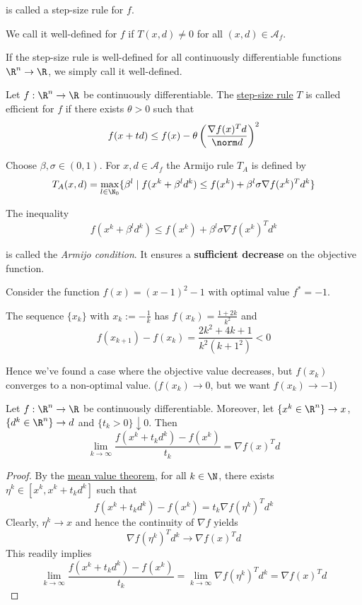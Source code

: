 is called a step-size rule for $f$.

We call it well-defined for $f$ if $T(x,d)\neq0$ for all
$(x,d)\in\mathcal{A}_f$.

If the step-size rule is well-defined for all continuously
differentiable functions ${\R}^n\to{\R}$, we simply call it
well-defined.


Let $f:\R^n\to\R$ be continuously differentiable. The
\hyperref[ae4eac6]{step-size rule} $T$ is called efficient for $f$ if
there exists $\theta>0$ such that
$$
	f(x+td)\leq f(x)-\theta\left(\frac{\nabla f(x)^Td}{\norm d}\right)^2
$$

\label{fefb024}

Choose $\beta,\sigma\in(0,1)$. For $x,d\in\hyperref[ae4eac6]{\mathcal
		A_f}$ the Armijo rule $T_A$ is defined by
$$
	T_A(x,d)=\max_{l\in\N_0}\{\beta^l\mid f(x^k+\beta^ld^k)\leq
	f(x^k)+\beta^l\sigma\nabla f(x^k)^Td^k\}
$$

The inequality
$$
	f(x^k+\beta^ld^k)\leq f(x^k)+\beta^l\sigma\nabla f(x^k)^Td^k
$$

is called the \textit{Armijo condition}. It ensures a
\textbf{sufficient decrease} on the objective function.


Consider the function $f(x)=(x-1)^2-1$ with optimal value $f^*=-1$.

The sequence $\{x_k\}$ with $x_k:=-\frac1k$ has
$f(x_k)=\frac{1+2k}{k^2}$ and
$$
	f(x_{k+1})-f(x_k)=\frac{2k^2+4k+1}{k^2(k+1^2)}<0
$$

Hence we've found a case where the objective value decreases, but
$f(x_k)$ converges to a non-optimal value. ($f(x_k)\to0$, but we want
$f(x_k)\to-1$)


Let $f:\R^n\to\R$ be continuously differentiable. Moreover, let
$\{x^k\in\R^n\}\to x$, $\{d^k\in\R^n\}\to d$ and
$\{t_k>0\}\downarrow0$. Then
$$
	\lim_{k\to\infty}\frac{f(x^k+t_kd^k)-f(x^k)}{t_k}=\nabla f(x)^Td
$$

\begin{proof}
	By the \hyperref[c1594c9]{mean value theorem}, for all $k\in\N$,
	there exists $\eta^k\in[x^k,x^k+t_kd^k]$ such that
	$$
		f(x^k+t_kd^k)-f(x^k)=t_k\nabla f(\eta^k)^Td^k
	$$
	Clearly, $\eta^k\to x$ and hence the continuity of $\nabla f$ yields
	$$
		\nabla f(\eta^k)^Td^k\to\nabla f(x)^Td
	$$
	This readily implies
	$$
		\lim_{k\to\infty}\frac{f(x^k+t_kd^k)-f(x^k)}{t_k}=
		\lim_{k\to\infty}\nabla f(\eta^k)^Td^k=
		\nabla f(x)^Td
	$$
\end{proof}

